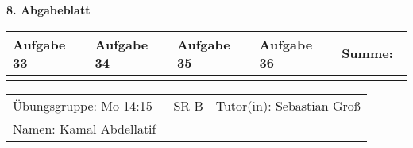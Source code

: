 \documentclass[a4paper, 12pt]{scrartcl}
\begin{document}
\begin{center}
    \textbf{8. Abgabeblatt}\\[2em]
	\def\arraystretch{2}
    \begin{tabular}{|l|l|l|l||p{18mm}|}
        \hline
        Aufgabe 33 & Aufgabe 34 & Aufgabe 35 & Aufgabe 36 & Summe:~ \\
        \hline &&&&\\
         \hline  
    \end{tabular}
\end{center}
\begingroup
\def\arraystretch{1.5}
\begin{tabular}{p{}p{}}
	\hline
    Übungsgruppe: Mo 14:15 ~~ SR B& Tutor(in): Sebastian Groß\\
    Namen: Kamal Abdellatif &\\
    \hline
\end{tabular}
\endgroup\\
\end{document}
